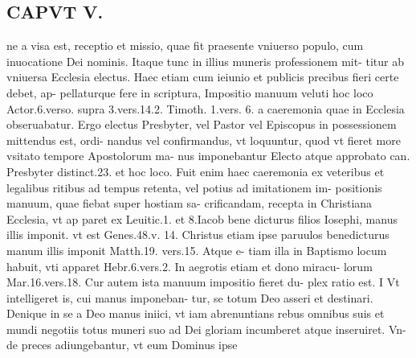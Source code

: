\documentclass{article}
\begin{document}
\begin{pages}
\section*{CAPVT  V. }
\marginpar{[ p.359 ]}\pstart ne a visa est, receptio et missio, quae fit praesente vniuerso populo, cum inuocatione Dei nominis. Itaque tunc in illius muneris professionem mit- titur ab vniuersa Ecclesia electus. Haec etiam cum ieiunio et publicis precibus fieri certe debet, ap- pellaturque fere in scriptura, Impositio manuum veluti hoc loco Actor.6.verso. supra 3.vers.14.2. Timoth. 1.vers. 6. a caeremonia quae in Ecclesia obseruabatur. Ergo electus Presbyter, vel Pastor vel Episcopus in possessionem mittendus est, ordi- nandus vel confirmandus, vt loquuntur, quod vt fieret more vsitato tempore Apostolorum ma- nus imponebantur Electo atque approbato can. Presbyter distinct.23. et hoc loco. Fuit enim haec caeremonia ex veteribus et legalibus ritibus ad tempus retenta, vel potius ad imitationem im- positionis manuum, quae fiebat super hostiam sa- crificandam, recepta in Christiana Ecclesia, vt ap paret ex Leuitic.1. et 8.Iacob bene dicturus filios Iosephi, manus illis imponit. vt est Genes.48.v. 14. Christus etiam ipse paruulos benedicturus manum illis imponit Matth.19. vers.15. Atque e- tiam illa in Baptismo locum habuit, vti apparet Hebr.6.vers.2. In aegrotis etiam et dono miracu- lorum Mar.16.vers.18. Cur autem ista manuum impositio fieret du- plex ratio est. I Vt intelligeret is, cui manus imponeban- tur, se totum Deo asseri et destinari. Denique in se a Deo manus iniici, vt iam abrenuntians rebus omnibus suis et mundi negotiis totus muneri suo ad Dei gloriam incumberet atque inseruiret. Vn- de preces adiungebantur, vt eum Dominus ipse  \pend

\end{pages}
\end{document}
